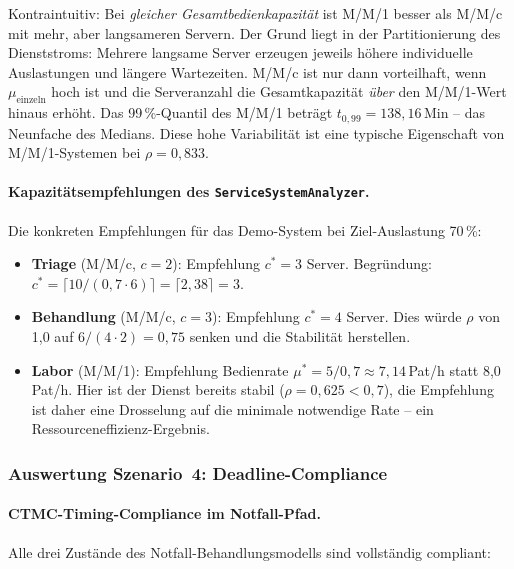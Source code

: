 ﻿\documentclass[a4paper,12pt]{scrreprt}
\theoremstyle{definition}
\begin{document}
Kontraintuitiv: Bei \emph{gleicher Gesamtbedienkapazität} ist M/M/1 besser
als M/M/c mit mehr, aber langsameren Servern. Der Grund liegt in der
Partitionierung des Dienststroms: Mehrere langsame Server erzeugen
jeweils höhere individuelle Auslastungen und längere Wartezeiten.
M/M/c ist nur dann vorteilhaft, wenn $\mu_\text{einzeln}$ hoch ist und
die Serveranzahl die Gesamtkapazität \emph{über} den M/M/1-Wert hinaus
erhöht. Das 99\,\%-Quantil des M/M/1 beträgt $t_{0{,}99} = 138{,}16$\,Min
-- das Neunfache des Medians. Diese hohe Variabilität ist eine typische
Eigenschaft von M/M/1-Systemen bei $\rho = 0{,}833$.

\paragraph{Kapazitätsempfehlungen des \texttt{ServiceSystemAnalyzer}.}
Die konkreten Empfehlungen für das Demo-System bei Ziel-Auslastung 70\,\%:
\begin{itemize}
	\item[-] \textbf{Triage} (M/M/c, $c=2$): Empfehlung $c^* = 3$ Server.
	Begründung: $c^* = \lceil 10/(0{,}7 \cdot 6) \rceil = \lceil 2{,}38 \rceil = 3$.
	\item[-] \textbf{Behandlung} (M/M/c, $c=3$): Empfehlung $c^* = 4$ Server.
	Dies würde $\rho$ von 1{,}0 auf $6/(4 \cdot 2) = 0{,}75$ senken und
	die Stabilität herstellen.
	\item[-] \textbf{Labor} (M/M/1): Empfehlung Bedienrate
	$\mu^* = 5/0{,}7 \approx 7{,}14$\,Pat/h statt 8{,}0\,Pat/h.
	Hier ist der Dienst bereits stabil ($\rho = 0{,}625 < 0{,}7$),
	die Empfehlung ist daher eine Drosselung auf die minimale
	notwendige Rate -- ein Ressourceneffizienz-Ergebnis.
\end{itemize}

\subsubsection{Auswertung Szenario~4: Deadline-Compliance}

\paragraph{CTMC-Timing-Compliance im Notfall-Pfad.}
Alle drei Zustände des Notfall-Behand\-lungsmodells sind vollständig compliant:
\end{document}
